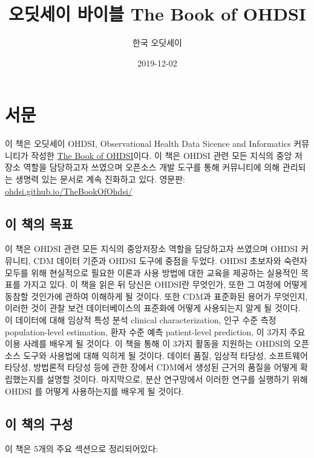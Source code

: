 \documentclass[10.5pt]{book}
\title{오딧세이 바이블 The Book of OHDSI}
\author{한국 오딧세이}
\date{2019-12-02}
\theoremstyle{definition}
\theoremstyle{definition}
\theoremstyle{definition}
\theoremstyle{remark}
\begin{document}
\maketitle

{
\setcounter{tocdepth}{1}
\tableofcontents
}
\chapter*{서문}

 이 책은 오딧세이 OHDSI, Observational Health Data Sicence and
Informatics 커뮤니티가 작성한 \href{book.ohdsi.org}{The Book of
OHDSI}이다. 이 책은 OHDSI 관련 모든 지식의 중앙 저장소 역할을 담당하고자
쓰였으며 오픈소스 개발 도구를 통해 커뮤니티에 의해 관리되는 생명력 있는
문서로 계속 진화하고 있다. 영문판:
\href{https://github.com/OHDSI/TheBookOfOhdsi}{ohdsi.github.io/TheBookOfOhdsi/}

\section*{이 책의 목표}\label{--}

이 책은 OHDSI 관련 모든 지식의 중앙저장소 역할을 담당하고자 쓰였으며
OHDSI 커뮤니티, CDM 데이터 기준과 OHDSI 도구에 중점을 두었다. OHDSI
초보자와 숙련자 모두를 위해 현실적으로 필요한 이론과 사용 방법에 대한
교육을 제공하는 실용적인 목표를 가지고 있다. 이 책을 읽은 뒤 당신은
OHDSI란 무엇인가, 또한 그 여정에 어떻게 동참할 것인가에 관하여 이해하게
될 것이다. 또한 CDM과 표준화된 용어가 무엇인지, 이러한 것이 관찰 보건
데이터베이스의 표준화에 어떻게 사용되는지 알게 될 것이다. 이 데이터에
대해 임상적 특성 분석 clinical characterization, 인구 수준 측정
population-level estimation, 환자 수준 예측 patient-level prediction, 이
3가지 주요 이용 사례를 배우게 될 것이다. 이 책을 통해 이 3가지 활동을
지원하는 OHDSI의 오픈 소스 도구와 사용법에 대해 익히게 될 것이다. 데이터
품질, 임상적 타당성, 소프트웨어 타당성, 방법론적 타당성 등에 관한 장에서
CDM에서 생성된 근거의 품질을 어떻게 확립했는지를 설명할 것이다.
마지막으로, 분산 연구망에서 이러한 연구를 실행하기 위해 OHDSI 를 어떻게
사용하는지를 배우게 될 것이다.

\section*{이 책의 구성}\label{--}

이 책은 5개의 주요 섹션으로 정리되어있다:
\end{document}
